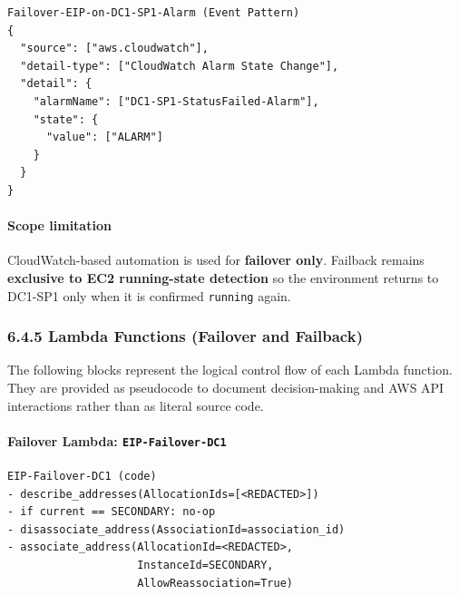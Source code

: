 \documentclass[11pt]{article}
\begin{document}
\begin{verbatim}
Failover-EIP-on-DC1-SP1-Alarm (Event Pattern)
{
  "source": ["aws.cloudwatch"],
  "detail-type": ["CloudWatch Alarm State Change"],
  "detail": {
    "alarmName": ["DC1-SP1-StatusFailed-Alarm"],
    "state": {
      "value": ["ALARM"]
    }
  }
}
\end{verbatim}

\paragraph{Scope limitation}
CloudWatch-based automation is used for \textbf{failover only}. Failback remains \textbf{exclusive to EC2 running-state detection} so the environment returns to DC1-SP1 only when it is confirmed \texttt{running} again.

%
%
%
\subsubsection{6.4.5 Lambda Functions (Failover and Failback)}

The following blocks represent the logical control flow of each Lambda function. They are provided as pseudocode to document decision-making and AWS API interactions rather than as literal source code.

\paragraph{Failover Lambda: \texttt{EIP-Failover-DC1}}

\begin{verbatim}
EIP-Failover-DC1 (code)
- describe_addresses(AllocationIds=[<REDACTED>])
- if current == SECONDARY: no-op
- disassociate_address(AssociationId=association_id)
- associate_address(AllocationId=<REDACTED>,
                    InstanceId=SECONDARY,
                    AllowReassociation=True)
\end{verbatim}
\end{document}
